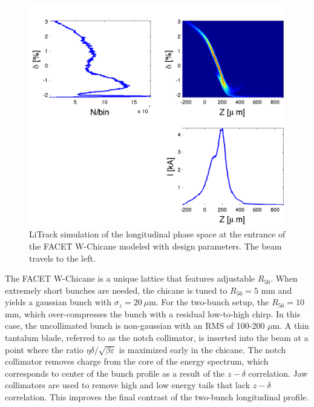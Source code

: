 \begin{figure}[hbt]
  \includegraphics[width=\columnwidth]{figures/sect19.pdf}
  \caption{LiTrack simulation of the longitudinal phase space at the entrance of the FACET W-Chicane modeled with design parameters. The beam travels to the left.}
  \label{sect19}
\end{figure}

The FACET W-Chicane is a unique lattice that features adjustable $R_{56}$.  When extremely short bunches are needed, the chicane is tuned to $R_{56} = 5$ mm and yields a gaussian bunch with $\sigma_z = 20~\mu$m. For the two-bunch setup, the $R_{56} = 10$ mm, which over-compresses the bunch with a residual low-to-high chirp. In this case, the uncollimated bunch is non-gaussian with an RMS of 100-200 $\mu$m. A thin tantalum blade, referred to as the notch collimator, is inserted into the beam at a point where the ratio $\eta \delta / \sqrt{ \beta \varepsilon}$ is maximized early in the chicane. The notch collimator removes charge from the core of the energy spectrum, which corresponds to center of the bunch profile as a result of the $z-\delta$ correlation. Jaw collimators are used to remove high and low energy tails that lack $z-\delta$ correlation. This improves the final contrast of the two-bunch longitudinal profile.

